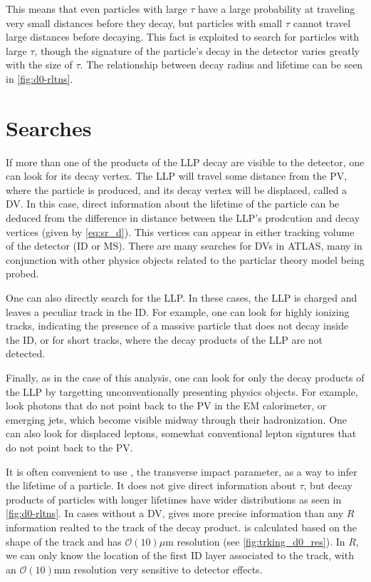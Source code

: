 This means that even particles with large $\tau$ have a large probability at traveling very small distances before they decay, but particles with small $\tau$ cannot travel large distances before decaying. This fact is exploited to search for particles with large $\tau$, though the signature of the particle's decay in the detector varies greatly with the size of $\tau$. The relationship between decay radius and lifetime can be seen in \autoref{fig:d0-rltns}.


\section{\label{sec:llp-searches}Searches}



If more than one of the products of the \ac{LLP} decay are visible to the detector, one can look for its decay vertex. The \ac{LLP} will travel some distance from the \ac{PV}, where the particle is produced, and its decay vertex will be displaced, called a \ac{DV}. In this case, direct information about the lifetime of the particle can be deduced from the difference in distance between the \ac{LLP}'s prodcution and decay vertices (given by \autoref{eq:sr_d}). This vertices can appear in either tracking volume of the detector (\ac{ID} or \ac{MS}). There are many searches for \ac{DV}s in \ac{ATLAS}, many in conjunction with other physics objects related to the particlar theory model being probed. 

One can also directly search for the \ac{LLP}. In these cases, the \ac{LLP} is charged and leaves a peculiar track in the \ac{ID}. For example, one can look for highly ionizing tracks, indicating the presence of a massive particle that does not decay inside the \ac{ID}, or for short tracks, where the decay products of the \ac{LLP} are not detected.

Finally, as in the case of this analysis, one can look for only the decay products of the \ac{LLP} by targetting  unconventionally presenting physics objects. For example, look photons that do not point back to the \ac{PV} in the \ac{EM} calorimeter, or emerging jets, which become visible midway through their hadronization. One can also look for displaced leptons, somewhat conventional lepton signtures that do not point back to the \ac{PV}. 

It is often convenient to use \dzero, the transverse impact parameter, as a way to infer the lifetime of a particle. It does not give direct information about $\tau$, but decay products of particles with longer lifetimes have wider \dzero distributions as seen in \autoref{fig:d0-rltns}. In cases without a \ac{DV}, \dzero gives more precise information than any $R$ information realted to the track of the decay product. \dzero is calculated based on the shape of the track and has $\mathcal{O}(10)\mu \textrm{m}$ resolution (see \autoref{fig:trking_d0_res}). In $R$, we can only know the location of the first \ac{ID} layer associated to the track, with an $\mathcal{O}(10)\textrm{mm}$ resolution very sensitive to detector effects.

